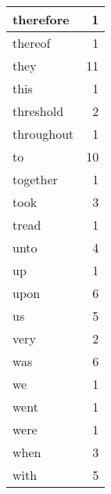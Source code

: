 \begin{center}
\begin{longtable}{l|r}
therefore & 1 \\ \hline
thereof & 1 \\ \hline
they & 11 \\ \hline
this & 1 \\ \hline
threshold & 2 \\ \hline
throughout & 1 \\ \hline
to & 10 \\ \hline
together & 1 \\ \hline
took & 3 \\ \hline
tread & 1 \\ \hline
unto & 4 \\ \hline
up & 1 \\ \hline
upon & 6 \\ \hline
us & 5 \\ \hline
very & 2 \\ \hline
was & 6 \\ \hline
we & 1 \\ \hline
went & 1 \\ \hline
were & 1 \\ \hline
when & 3 \\ \hline
with & 5 \\ \hline
\end{longtable}
\end{center}



\normalsize



